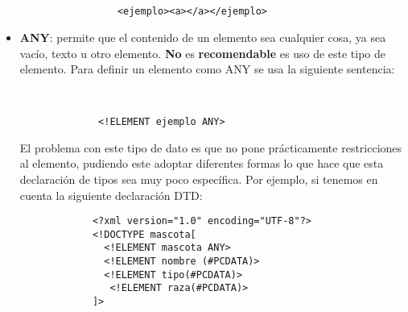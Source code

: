 \begin{itemize}
\begin{itemize}
        \begin{figure}[H]
            \begin{tcolorbox}[sharp corners, colback=yellow!30, colframe=white!20]
                \scriptsize
                \begin{verbatim}


        <ejemplo><a></a></ejemplo>
                \end{verbatim}
            \end{tcolorbox}
        \end{figure}
    \end{itemize}

    \item \textbf{ANY}: permite que el contenido de un elemento sea cualquier cosa, ya sea vacío, texto u otro elemento. \textbf{No} es \textbf{recomendable} es uso de este tipo de elemento. Para definir un elemento como ANY se usa la siguiente sentencia:

     \begin{figure}[H]
        \begin{tcolorbox}[sharp corners, colback=yellow!30, colframe=white!20]
            \scriptsize
            \begin{verbatim}


        <!ELEMENT ejemplo ANY>
            \end{verbatim}
        \end{tcolorbox}
    \end{figure}

    El problema con este tipo de dato es que no pone prácticamente restricciones al elemento, pudiendo este adoptar diferentes formas lo que hace que esta declaración de tipos sea muy poco específica. Por ejemplo, si tenemos en cuenta la siguiente declaración DTD:

    \begin{figure}[H]
        \begin{tcolorbox}[sharp corners, colback=yellow!30, colframe=white!20]
            \scriptsize
            \begin{verbatim}
       <?xml version="1.0" encoding="UTF-8"?>
       <!DOCTYPE mascota[
         <!ELEMENT mascota ANY>
         <!ELEMENT nombre (#PCDATA)>
         <!ELEMENT tipo(#PCDATA)>
          <!ELEMENT raza(#PCDATA)>
       ]>
            \end{verbatim}
        \end{tcolorbox}
    \end{figure}


\end{itemize}
